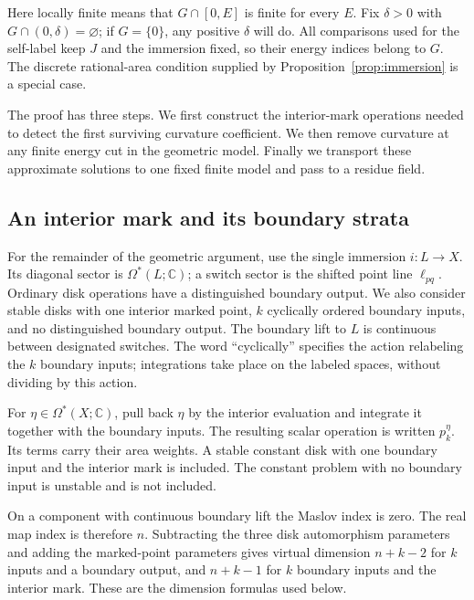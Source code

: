 \documentclass[11pt]{article}
\numberwithin{equation}{section}
\theoremstyle{definition}
\theoremstyle{remark}
\newcommand{\C}{\mathbb C}
\begin{document}
Here locally finite means that $G\cap[0,E]$ is finite for every $E$.
Fix $\delta>0$ with $G\cap(0,\delta)=\varnothing$; if $G=\{0\}$,
any positive $\delta$ will do.  All comparisons used for the self-label
keep $J$ and the immersion fixed, so their energy indices belong to
$G$.  The discrete rational-area condition supplied by
Proposition~\ref{prop:immersion} is a special case.

The proof has three steps.  We first construct the interior-mark
operations needed to detect the first surviving curvature coefficient.
We then remove curvature at any finite energy cut in the geometric
model.  Finally we transport these approximate solutions to one fixed
finite model and pass to a residue field.

\subsection{An interior mark and its boundary strata}
\label{subsec:interior-mark}

For the remainder of the geometric argument, use the single immersion
$i:L\to X$.  Its diagonal sector is $\Omega^*(L;\C)$; a switch sector is
the shifted point line $\ell_{pq}$.  Ordinary disk operations have a
distinguished boundary output.  We also consider stable disks with one
interior marked point, $k$ cyclically ordered boundary inputs, and no
distinguished boundary output.  The boundary lift to $L$ is continuous
between designated switches.  The word ``cyclically'' specifies the
action relabeling the $k$ boundary inputs; integrations take place on
the labeled spaces, without dividing by this action.

For $\eta\in\Omega^*(X;\C)$, pull back $\eta$ by the interior evaluation
and integrate it together with the boundary inputs.  The resulting
scalar operation is written $p^\eta_k$.  Its terms carry their area
weights.  A stable constant disk with one boundary input and the
interior mark is included.  The constant problem with no boundary input
is unstable and is not included.

On a component with continuous boundary lift the Maslov index is zero.
The real map index is therefore $n$.  Subtracting the three disk
automorphism parameters and adding the marked-point parameters gives
virtual dimension $n+k-2$ for $k$ inputs and a boundary output, and
$n+k-1$ for $k$ boundary inputs and the interior mark.  These are the
dimension formulas used below.
\end{document}

